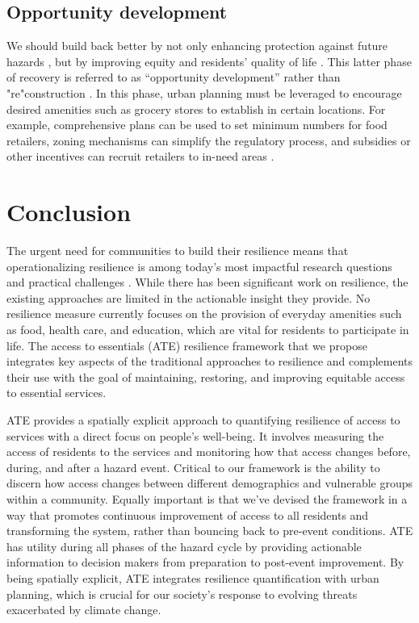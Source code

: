 \documentclass[9pt,twocolumn,twoside,lineno]{pnas-new}
\begin{document}
\subsection*{Opportunity development}
We should build back better \cite{Resendiz-Vazquez2019-ol, Folke2010-bz} by not only enhancing protection against future hazards \cite{Platt2019-lx}, but by improving equity and residents’ quality of life \cite{Pantelic1991-qu}. 
This latter phase of recovery is referred to as “opportunity development” rather than "re"construction \cite{Resendiz-Vazquez2019-ol,Pantelic1991-qu}. 
In this phase, urban planning must be leveraged to encourage desired amenities such as grocery stores to establish in certain locations. 
For example, comprehensive plans can be used to set minimum numbers for food retailers, zoning mechanisms can simplify the regulatory process, and subsidies or other incentives can recruit retailers to in-need areas \cite{Raja2010-cm, Raja2008-wx}. 

\section*{Conclusion}
The urgent need for communities to build their resilience means that operationalizing resilience is among today's most impactful research questions and practical challenges \cite{Caldarice2019-tv}.
While there has been significant work on resilience, the existing approaches are limited in the actionable insight they provide.
No resilience measure currently focuses on the provision of everyday amenities such as food, health care, and education, which are vital for residents to participate in life.
The access to essentials (ATE) resilience framework that we propose integrates key aspects of the traditional approaches to resilience and complements their use with the goal of maintaining, restoring, and improving equitable access to essential services.

ATE provides a spatially explicit approach to quantifying resilience of access to services with a direct focus on people's well-being. 
It involves measuring the access of residents to the services and monitoring how that access changes before, during, and after a hazard event. 
Critical to our framework is the ability to discern how access changes between different demographics and vulnerable groups within a community.
Equally important is that we've devised the framework in a way that promotes continuous improvement of access to all residents and transforming the system, rather than bouncing back to pre-event conditions.
ATE has utility during all phases of the hazard cycle by providing actionable information to decision makers from preparation to post-event improvement.
By being spatially explicit, ATE integrates resilience quantification with urban planning, which is crucial for our society's response to evolving threats exacerbated by climate change.
\end{document}

